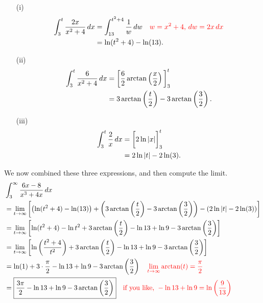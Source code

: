 \documentclass[noinstructornotes]{ximera}
\begin{document}
\begin{problem}
\begin{enumerate}
\begin{freeResponse}
\begin{enumerate}
		\begin{enumerate}
		\item[(i)]  \begin{align*}
		\int_3^t \frac{2x}{x^2+4} \,d x &= \int_{13}^{t^2+4} \frac{1}{w} \,d w	\quad	{\color{red}w=x^2+4, \,dw = 2x \,dx}  \\
		&= \ln(t^2 +4) - \ln(13).
		\end{align*}
		
		\item[(ii)]  \begin{align*}
		\int_3^t \frac{6}{x^2+4} \,d x &= \bigg[ \frac{6}{2} \arctan \left( \frac{x}{2} \right)  \bigg]_3^t  \\
		&= 3 \arctan \left(\frac{t}{2} \right) - 3 \arctan \left( \frac{3}{2} \right).
		\end{align*}
		
		\item[(iii)]  \begin{align*}
		\int_3^t \frac{2}{x} \,d x &= \bigg[  2 \ln|x|  \bigg]_3^t  \\
		&= 2 \ln|t| - 2\ln(3).
		\end{align*}
		
		\end{enumerate}
	We now combined these three expressions, and then compute the limit.
		\begin{align*}
		&\int_3^\infty \frac{6x-8}{x^3+4x} \,d x  \\
		&= \lim_{t \to \infty} \left[ \left(\ln(t^2 +4) - \ln(13) \right) + \left( 3 \arctan \left(\frac{t}{2} \right) - 3 \arctan \left( \frac{3}{2} \right) \right) - \left( 2 \ln|t| - 2\ln(3) \right) \right]  \\
		&= \lim_{t \to \infty} \left[ \ln(t^2+4) - \ln t^2 + 3 \arctan \left( \frac{t}{2} \right) - \ln 13 + \ln 9 - 3 \arctan \left( \frac{3}{2} \right) \right]  \\
		&= \lim_{t \to \infty} \left[ \ln \left( \frac{t^2+4}{t^2} \right) + 3 \arctan \left( \frac{t}{2} \right) - \ln 13 + \ln 9 - 3 \arctan \left( \frac{3}{2} \right) \right]  \\
		&= \ln(1) + 3 \cdot \frac{\pi}{2} - \ln 13 + \ln 9 - 3 \arctan \left( \frac{3}{2} \right) 	\quad	{\color{red}\lim_{t \to \infty} \arctan(t) = \frac{\pi}{2}}\\
		&= \boxed{\frac{3\pi}{2} - \ln 13 + \ln 9 - 3 \arctan \left( \frac{3}{2} \right)}	\quad	{\color{red}\text{if you like, }- \ln 13 + \ln 9 = \ln \left( \frac{9}{13} \right)}
		\end{align*}
	
	\end{enumerate}
	\end{freeResponse}
	
	\end{enumerate}
\end{problem}
\end{document}
